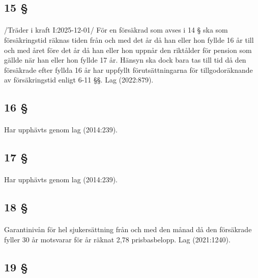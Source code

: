 \documentclass[a4paper,notitlepage,openany,10pt]{book}
\begin{document}
\subsection*{15 §}
\paragraph*{}
/Träder i kraft I:2025-12-01/
För en försäkrad som avses i 14 § ska som försäkringstid räknas tiden från och med det år då han eller hon fyllde 16 år till och med året före det år då han eller hon uppnår den riktålder för pension som gällde när han eller hon fyllde 17 år. Hänsyn ska dock bara tas till tid då den försäkrade efter fyllda 16 år har uppfyllt förutsättningarna för tillgodoräknande av försäkringstid enligt 6-11 §§.
Lag (2022:879).
\subsection*{16 §}
\paragraph*{}
Har upphävts genom
lag (2014:239).
\subsection*{17 §}
\paragraph*{}
Har upphävts genom
lag (2014:239).
\subsection*{18 §}
\paragraph*{}
Garantinivån för hel sjukersättning från och med den månad då den försäkrade fyller 30 år motsvarar för år räknat 2,78 prisbasbelopp.
Lag (2021:1240).
\subsection*{19 §}
\end{document}
